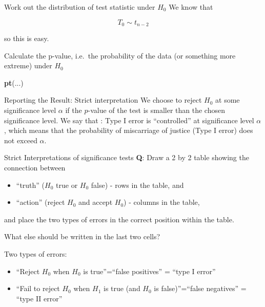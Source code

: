 \documentclass[
  ignorenonframetext,
]{beamer}
\newenvironment{Shaded}{\begin{snugshade}}{\end{snugshade}}
\newcommand{\FunctionTok}[1]{\textcolor[rgb]{0.13,0.29,0.53}{\textbf{#1}}}
\newcommand{\NormalTok}[1]{#1}
\providecommand{\tightlist}{%
  \setlength{\itemsep}{0pt}\setlength{\parskip}{0pt}}
\begin{document}
\begin{frame}{Work out the distribution of test statistic under \(H_0\)}
\label{work-out-the-distribution-of-test-statistic-under-h_0}
We know that

\[
T_0\sim t_{n-2}
\]

so this is easy.
\end{frame}

\begin{frame}[fragile]{Calculate the p-value, i.e.~the probability of
the data (or something more extreme) under \(H_0\)}
\label{calculate-the-p-value-i.e.-the-probability-of-the-data-or-something-more-extreme-under-h_0}
\begin{Shaded}
\begin{Highlighting}[]
\FunctionTok{pt}\NormalTok{(...)}
\end{Highlighting}
\end{Shaded}
\end{frame}

\begin{frame}{Reporting the Result: Strict interpretation}
\label{reporting-the-result-strict-interpretation}
We choose to reject \(H_0\) at some significance level \(\alpha\) if the
\(p\)-value of the test is smaller than the chosen significance level.
We say that : Type I error is ``controlled'' at significance level
\(\alpha\), which means that the probability of miscarriage of justice
(Type I error) does not exceed \(\alpha\).
\end{frame}

\begin{frame}{Strict Interpretations of significance tests}
\label{strict-interpretations-of-significance-tests}
\textbf{Q}: Draw a 2 by 2 table showing the connection between

\begin{itemize}
\tightlist
\item
  ``truth'' (\(H_0\) true or \(H_0\) false) - rows in the table, and
\item
  ``action'' (reject \(H_0\) and accept \(H_0\)) - columns in the table,
\end{itemize}

and place the two types of errors in the correct position within the
table.

What else should be written in the last two cells?
\end{frame}

\begin{frame}{Two types of errors:}
\label{two-types-of-errors}
\begin{itemize}
\item
  ``Reject \(H_0\) when \(H_0\) is true''=``false positives'' = ``type I
  error''
\item
  ``Fail to reject \(H_0\) when \(H_1\) is true (and \(H_0\) is
  false)''=``false negatives'' = ``type II error''
\end{itemize}
\end{frame}
\end{document}
